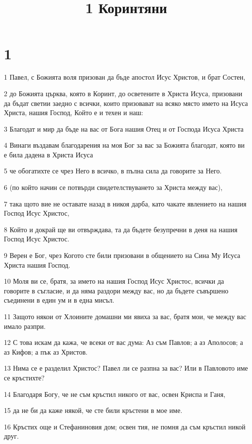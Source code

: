 

\title{1 Коринтяни}


\chapter{1}

\par 1 Павел, с Божията воля призован да бъде апостол Исус Христов, и брат Состен,
\par 2 до Божията църква, която в Коринт, до осветените в Христа Исуса, призовани да бъдат светии заедно с всички, които призовават на всяко място името на Исуса Христа, нашия Господ, Който е и техен и наш:
\par 3 Благодат и мир да бъде на вас от Бога нашия Отец и от Господа Исуса Христа
\par 4 Винаги въздавам благодарения на моя Бог за вас за Божията благодат, която ви е била дадена в Христа Исуса
\par 5 че обогатихте се чрез Него в всичко, в пълна сила да говорите за Него.
\par 6 (по който начин се потвърди свидетелствуването за Христа между вас),
\par 7 така щото вие не оставате назад в никоя дарба, като чакате явлението на нашия Господ Исус Христос,
\par 8 Който и докрай ще ви отвърждава, та да бъдете безупречни в деня на нашия Господ Исус Христос.
\par 9 Верен е Бог, чрез Когото сте били призовани в общението на Сина Му Исуса Христа нашия Господ.
\par 10 Моля ви се, братя, за името на нашия Господ Исус Христос, всички да говорите в съгласие, и да няма раздори между вас, но да бъдете съвършено съединени в един ум и в една мисъл.
\par 11 Защото някои от Хлоините домашни ми явиха за вас, братя мои, че между вас имало разпри.
\par 12 С това искам да кажа, че всеки от вас дума: Аз съм Павлов; а аз Аполосов; а аз Кифов; а пък аз Христов.
\par 13 Нима се е разделил Христос? Павел ли се разпна за вас? Или в Павловото име се кръстихте?
\par 14 Благодаря Богу, че не съм кръстил никого от вас, освен Криспа и Ганя,
\par 15 да не би да каже някой, че сте били кръстени в мое име.
\par 16 Кръстих още и Стефаниновия дом; освен тия, не помня да съм кръстил никой друг.
